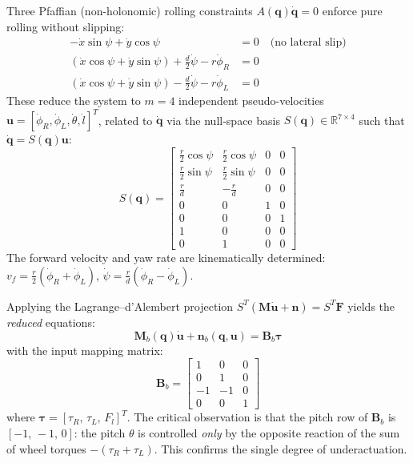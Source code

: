 \documentclass[11pt,a4paper]{article}
\newcommand{\bq}{\bm{q}}
\newcommand{\bdq}{\dot{\bm{q}}}
\newcommand{\btau}{\bm{\tau}}
\newcommand{\bM}{\bm{M}}
\newcommand{\bB}{\bm{B}}
\newcommand{\Real}{\mathbb{R}}
\begin{document}
Three Pfaffian (non-holonomic) rolling constraints $A(\bq)\bdq = 0$ enforce pure rolling
without slipping:
\begin{align}
    -\dot{x}\sin\psi + \dot{y}\cos\psi &= 0 \quad \text{(no lateral slip)} \\
    (\dot{x}\cos\psi + \dot{y}\sin\psi) + \tfrac{d}{2}\dot\psi - r\dot\phi_R &= 0 \\
    (\dot{x}\cos\psi + \dot{y}\sin\psi) - \tfrac{d}{2}\dot\psi - r\dot\phi_L &= 0
\end{align}
These reduce the system to $m = 4$ independent pseudo-velocities
$\bm{u} = [\dot\phi_R, \dot\phi_L, \dot\theta, \dot{l}]^T$, related to $\bdq$ via the
null-space basis $S(\bq) \in \Real^{7\times 4}$ such that $\bdq = S(\bq)\bm{u}$:
\begin{equation}
    S(\bq) = \begin{bmatrix}
        \tfrac{r}{2}\cos\psi & \tfrac{r}{2}\cos\psi & 0 & 0 \\[2pt]
        \tfrac{r}{2}\sin\psi & \tfrac{r}{2}\sin\psi & 0 & 0 \\[2pt]
        \tfrac{r}{d} & -\tfrac{r}{d} & 0 & 0 \\[2pt]
        0 & 0 & 1 & 0 \\
        0 & 0 & 0 & 1 \\
        1 & 0 & 0 & 0 \\
        0 & 1 & 0 & 0
    \end{bmatrix}
    \label{eq:Smatrix}
\end{equation}
The forward velocity and yaw rate are kinematically determined:
$v_f = \tfrac{r}{2}(\dot\phi_R + \dot\phi_L)$,\quad
$\dot\psi = \tfrac{r}{d}(\dot\phi_R - \dot\phi_L)$.

Applying the Lagrange--d'Alembert projection $S^T(\bM\dot{\bm{u}} + \bm{n}) = S^T\bm{F}$
yields the \emph{reduced} equations:
\begin{equation}
    \bM_b(\bq)\dot{\bm{u}} + \bm{n}_b(\bq,\bm{u}) = \bB_b\btau
\end{equation}
with the input mapping matrix:
\begin{equation}
    \bB_b = \begin{bmatrix}
        1 & 0 & 0 \\
        0 & 1 & 0 \\
        -1 & -1 & 0 \\
        0 & 0 & 1
    \end{bmatrix}
    \label{eq:Bb}
\end{equation}
where $\btau = [\tau_R,\,\tau_L,\,F_l]^T$.  The critical observation is that the pitch row
of $\bB_b$ is $[-1,\,-1,\,0]$: the pitch $\theta$ is controlled \emph{only} by the
opposite reaction of the sum of wheel torques $-(\tau_R + \tau_L)$.  This confirms the
single degree of underactuation.
\end{document}
